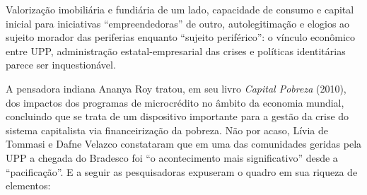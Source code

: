 Valorização imobiliária e fundiária de um lado, capacidade de consumo e
capital inicial para iniciativas ``empreendedoras'' de outro,
autolegitimação e elogios ao sujeito morador das periferias enquanto
``sujeito periférico'': o vínculo econômico entre UPP, administração
estatal-empresarial das crises e políticas identitárias parece ser
inquestionável.

A pensadora indiana Ananya Roy tratou, em seu livro \emph{Capital
Pobreza} (2010), dos impactos dos programas de microcrédito no âmbito da
economia mundial, concluindo que se trata de um dispositivo importante
para a gestão da crise do sistema capitalista via financeirização da
pobreza. Não por acaso, Lívia de Tommasi e Dafne Velazco constataram que
em uma das comunidades geridas pela UPP a chegada do Bradesco foi ``o
acontecimento mais significativo'' desde a ``pacificação''. E a seguir
as pesquisadoras expuseram o quadro em sua riqueza de elementos:

